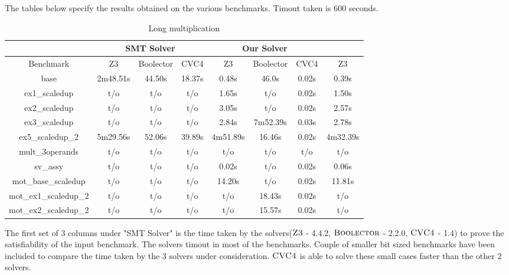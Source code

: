 The tables below specify the results obtained on the various benchmarks. Timout taken is 600 seconds.
%

\begin{table}[]
\centering
\caption{Long multiplication}
\label{my-label}
\begin{tabular}{|c|c|c|c|c|c|c|c|}
\hline
                      & \multicolumn{3}{c|}{SMT Solver} & \multicolumn{3}{c|}{Our Solver} &          \\ \hline
Benchmark             & Z3        & Boolector  & CVC4   & Z3        & Boolector  & CVC4   & Z3       \\ \hline
base                  & 2m48.51s  & 44.50s     & 18.37s & 0.48s     & 46.0s      & 0.02s  & 0.39s    \\ \hline
ex1\_scaledup         & t/o       & t/o        & t/o    & 1.65s     & t/o        & 0.02s  & 1.50s    \\ \hline
ex2\_scaledup         & t/o       & t/o        & t/o    & 3.05s     & t/o        & 0.02s  & 2.57s    \\ \hline
ex3\_scaledup         & t/o       & t/o        & t/o    & 2.84s     & 7m52.39s   & 0.03s  & 2.78s    \\ \hline
ex5\_scaledup\_2      & 5m29.56s  & 52.06s     & 39.89s & 4m51.89s  & 16.46s     & 0.02s  & 4m32.39s \\ \hline
mult\_3operands       & t/o       & t/o        & t/o    & t/o       & t/o        & t/o    & t/o      \\ \hline
sv\_assy              & t/o       & t/o        & t/o    & 0.02s     & t/o        & 0.02s  & 0.06s    \\ \hline
mot\_base\_scaledup   & t/o       & t/o        & t/o    & 14.20s    & t/o        & 0.02s  & 11.81s   \\ \hline
mot\_ex1\_scaledup\_2 & t/o       & t/o        & t/o    & t/o       & 18.43s     & 0.02s  & t/o      \\ \hline
mot\_ex2\_scaledup\_2 & t/o       & t/o        & t/o    & t/o       & 15.57s     & 0.02s  & t/o      \\ \hline
\end{tabular}
\end{table}




The first set of 3 columns under "SMT Solver" is the time taken by the solvers($\textsc{Z3}$ - 4.4.2, $\textsc{Boolector}$ - 2.2.0, $\textsc{CVC4}$ - 1.4) to prove the satisfiability of the input benchmark. The solvers timout in most of the benchmarks. Couple of smaller bit sized benchmarks have been included to compare the time taken by the 3 solvers under consideration. $\textsc{CVC4}$ is able to solve these small cases faster than the other 2 solvers.

